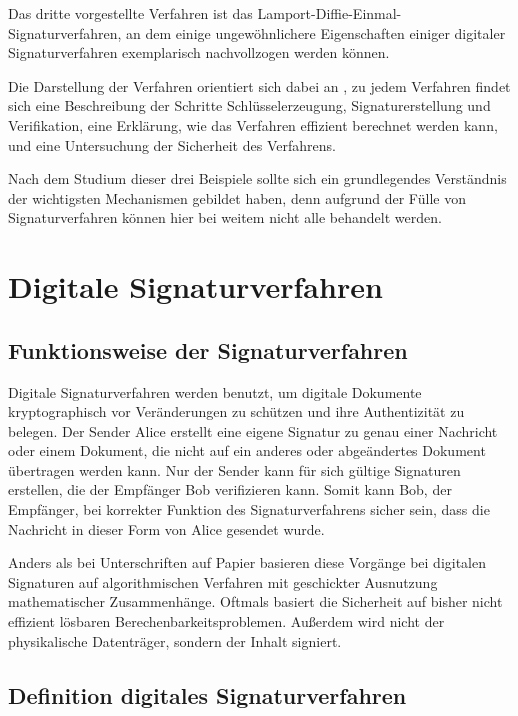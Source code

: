 \documentclass[a4paper,12pt,oneside]{scrreprt}
\begin{document}
Das dritte vorgestellte Verfahren ist das Lamport-Diffie-Einmal-Signaturverfahren, an dem einige ungewöhnlichere Eigenschaften einiger digitaler Signaturverfahren exemplarisch nachvollzogen werden können. 

Die Darstellung der Verfahren orientiert sich dabei an \cite{buchmann2010einfa1}, zu jedem Verfahren findet sich eine Beschreibung der Schritte Schlüsselerzeugung, Signaturerstellung und Verifikation, eine Erklärung, wie das Verfahren effizient berechnet werden kann, und eine Untersuchung der Sicherheit des Verfahrens.

Nach dem Studium dieser drei Beispiele sollte sich ein grundlegendes Verständnis der wichtigsten Mechanismen gebildet haben, denn aufgrund der Fülle von Signaturverfahren können hier bei weitem nicht alle behandelt werden. 

\chapter{Digitale Signaturverfahren}

\section{Funktionsweise der Signaturverfahren}

Digitale Signaturverfahren werden benutzt, um digitale Dokumente kryptographisch vor Veränderungen zu schützen und ihre Authentizität zu belegen. Der Sender Alice erstellt eine eigene Signatur zu genau einer Nachricht oder einem Dokument, die nicht auf ein anderes oder abgeändertes Dokument übertragen werden kann. Nur der Sender kann für sich gültige Signaturen erstellen, die der Empfänger Bob verifizieren kann. Somit kann Bob, der Empfänger, bei korrekter Funktion des Signaturverfahrens sicher sein, dass die Nachricht in dieser Form von Alice gesendet wurde. 

Anders als bei Unterschriften auf Papier basieren diese Vorgänge bei digitalen Signaturen auf algorithmischen Verfahren mit geschickter Ausnutzung mathematischer Zusammenhänge. Oftmals basiert die Sicherheit auf bisher nicht effizient lösbaren Berechenbarkeitsproblemen. Außerdem wird nicht der physikalische Datenträger, sondern der Inhalt signiert. 

\section{Definition digitales Signaturverfahren}
\end{document}
